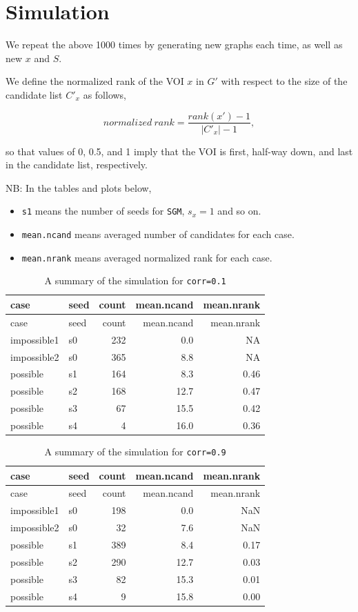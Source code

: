 \documentclass[]{article}
\providecommand{\tightlist}{%
  \setlength{\itemsep}{0pt}\setlength{\parskip}{0pt}}
\begin{document}
\section{Simulation}\label{simulation}

We repeat the above 1000 times by generating new graphs each time, as
well as new \(x\) and \(S\).

We define the normalized rank of the VOI \(x\) in \(G'\) with respect to
the size of the candidate list \(C'_x\) as follows,

\[normalized~rank = \frac{rank(x') -1}{|C'_x|-1},\]

so that values of 0, 0.5, and 1 imply that the VOI is first, half-way
down, and last in the candidate list, respectively.

NB: In the tables and plots below,

\begin{itemize}
\tightlist
\item
  \texttt{s1} means the number of seeds for \texttt{SGM}, \(s_x=1\) and
  so on.
\item
  \texttt{mean.ncand} means averaged number of candidates for each case.
\item
  \texttt{mean.nrank} means averaged normalized rank for each case.
\end{itemize}

\begin{longtable}[]{@{}llrrr@{}}
\caption{A summary of the simulation for
\texttt{corr=0.1}}\tabularnewline
\toprule
case & seed & count & mean.ncand & mean.nrank\tabularnewline
\midrule
\endfirsthead
\toprule
case & seed & count & mean.ncand & mean.nrank\tabularnewline
\midrule
\endhead
impossible1 & s0 & 232 & 0.0 & NA\tabularnewline
impossible2 & s0 & 365 & 8.8 & NA\tabularnewline
possible & s1 & 164 & 8.3 & 0.46\tabularnewline
possible & s2 & 168 & 12.7 & 0.47\tabularnewline
possible & s3 & 67 & 15.5 & 0.42\tabularnewline
possible & s4 & 4 & 16.0 & 0.36\tabularnewline
\bottomrule
\end{longtable}

\begin{longtable}[]{@{}llrrr@{}}
\caption{A summary of the simulation for
\texttt{corr=0.9}}\tabularnewline
\toprule
case & seed & count & mean.ncand & mean.nrank\tabularnewline
\midrule
\endfirsthead
\toprule
case & seed & count & mean.ncand & mean.nrank\tabularnewline
\midrule
\endhead
impossible1 & s0 & 198 & 0.0 & NaN\tabularnewline
impossible2 & s0 & 32 & 7.6 & NaN\tabularnewline
possible & s1 & 389 & 8.4 & 0.17\tabularnewline
possible & s2 & 290 & 12.7 & 0.03\tabularnewline
possible & s3 & 82 & 15.3 & 0.01\tabularnewline
possible & s4 & 9 & 15.8 & 0.00\tabularnewline
\bottomrule
\end{longtable}
\end{document}
